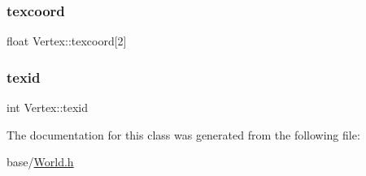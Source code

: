 \subsubsection{\texorpdfstring{texcoord}{texcoord}}
{\footnotesize\ttfamily float Vertex\+::texcoord\mbox{[}2\mbox{]}}

\mbox{\label{classVertex_a815ba08ef2158ab5a15b4c8a5f07b4cd}} 
\subsubsection{\texorpdfstring{texid}{texid}}
{\footnotesize\ttfamily int Vertex\+::texid}



The documentation for this class was generated from the following file\+:\begin{DoxyCompactItemize}
\item 
base/\mbox{\hyperlink{World_8h}{World.\+h}}\end{DoxyCompactItemize}
